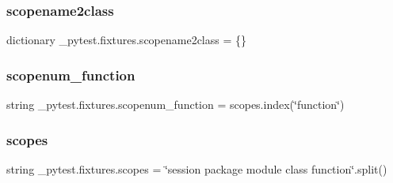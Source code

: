 \subsubsection{\texorpdfstring{scopename2class}{scopename2class}}
{\footnotesize\ttfamily dictionary \+\_\+pytest.\+fixtures.\+scopename2class = \{\}}

\mbox{\label{namespace__pytest_1_1fixtures_aeaedc5d547d078e5e81f0344ea8b023c}} 
\subsubsection{\texorpdfstring{scopenum\+\_\+function}{scopenum\_function}}
{\footnotesize\ttfamily string \+\_\+pytest.\+fixtures.\+scopenum\+\_\+function = scopes.\+index(\char`\"{}function\char`\"{})}

\mbox{\label{namespace__pytest_1_1fixtures_a5015c1644820a9b78acf9d3466b0d57e}} 
\subsubsection{\texorpdfstring{scopes}{scopes}}
{\footnotesize\ttfamily string \+\_\+pytest.\+fixtures.\+scopes = \char`\"{}session package module class function\char`\"{}.split()}

